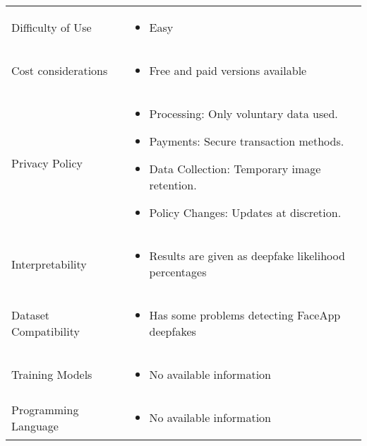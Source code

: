 \begin{table}[htpb]
\begin{tabularx}{\textwidth}{l X}
		\addlinespace
		Difficulty of Use            & \begin{itemize}
			                               \item Easy
		                               \end{itemize}                                             \\
		\addlinespace
		Cost considerations          & \begin{itemize}
			                               \item Free and paid versions available
		                               \end{itemize}                      \\
		\addlinespace
		Privacy Policy               & \begin{itemize}
			                               \item Processing: Only voluntary data used.
			                               \item Payments: Secure transaction methods.
			                               \item Data Collection: Temporary image retention.
			                               \item Policy Changes: Updates at discretion.
		                               \end{itemize}           \\
		\addlinespace
		Interpretability             & \begin{itemize}
			                               \item Results are given as deepfake likelihood percentages
		                               \end{itemize}  \\
		\addlinespace
		Dataset Compatibility        & \begin{itemize}
			                               \item Has some problems detecting FaceApp deepfakes
		                               \end{itemize}         \\
		\addlinespace
		Training Models              & \begin{itemize}
			                               \item No available information
		                               \end{itemize}                              \\
		\addlinespace
		Programming Language         & \begin{itemize}
			                               \item No available information
		                               \end{itemize}                              \\
		\bottomrule
	\end{tabularx}
\end{table}

